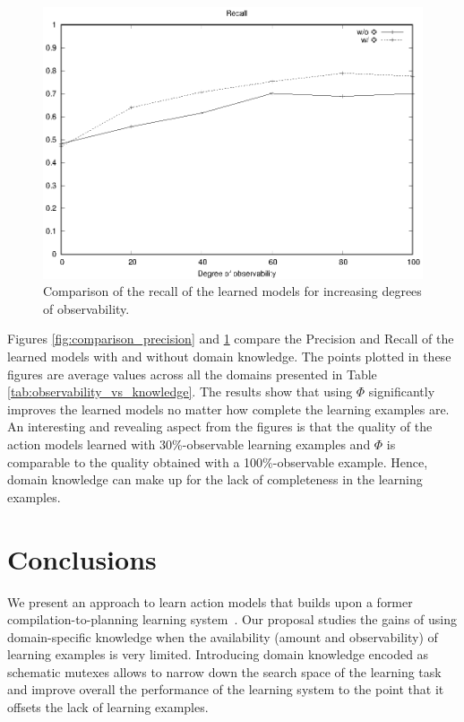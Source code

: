 \documentclass{article}
\begin{document}
\begin{figure}[hbt!]
	\centering
	\includegraphics[width=\linewidth]{figures/comparison_recall.eps}
	\caption{Comparison of the recall of the learned models for increasing degrees of observability.}
	\label{fig:comparison_recall}
\end{figure}

Figures \ref{fig:comparison_precision} and \ref{fig:comparison_recall} compare the Precision and Recall of the learned models with and without domain knowledge. The points plotted in these figures are average values across all the domains presented in Table \ref{tab:observability_vs_knowledge}. The results show that using $\Phi$ significantly improves the learned models no matter how complete the learning examples are. An interesting and revealing aspect from the figures is that the quality of the action models learned with 30\%-observable learning examples and $\Phi$ is comparable to the quality obtained with a 100\%-observable example. Hence, domain knowledge can make up for the lack of completeness in the learning examples.



\section{Conclusions}
\label{sec:conclusions}

We present an approach to learn action models that builds upon a former compilation-to-planning learning system~\cite{aineto2018learning}. Our proposal studies the gains of using domain-specific knowledge when the availability (amount and observability) of learning examples is very limited. Introducing domain knowledge encoded as schematic mutexes allows to narrow down the search space of the learning task and improve overall the performance of the learning system to the point that it offsets the lack of learning examples.
\end{document}
